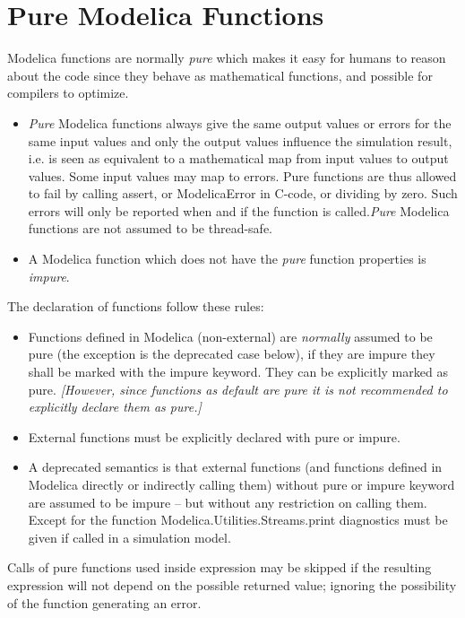 \section{Pure Modelica Functions}

Modelica functions are normally \emph{pure} which makes it easy for
humans to reason about the code since they behave as mathematical
functions, and possible for compilers to optimize.

\begin{itemize}
\item
  \emph{Pure} Modelica functions always give the same output values or
  errors for the same input values and only the output values influence
  the simulation result, i.e. is seen as equivalent to a mathematical
  map from input values to output values. Some input values may map to
  errors. Pure functions are thus allowed to fail by calling assert, or
  ModelicaError in C-code, or dividing by zero. Such errors will only be
  reported when and if the function is called.\emph{Pure} Modelica
  functions are not assumed to be thread-safe.
\item
  A Modelica function which does not have the \emph{pure} function
  properties is \emph{impure}.
\end{itemize}

The declaration of functions follow these rules:

\begin{itemize}
\item
  Functions defined in Modelica (non-external) are \emph{normally}
  assumed to be pure (the exception is the deprecated case below), if
  they are impure they shall be marked with the impure keyword. They can
  be explicitly marked as pure. \emph{{[}However, since functions as
  default are pure it is not recommended to explicitly declare them as
  pure.{]}}
\item
  External functions must be explicitly declared with pure or impure.
\item
  A deprecated semantics is that external functions (and functions
  defined in Modelica directly or indirectly calling them) without pure
  or impure keyword are assumed to be impure -- but without any
  restriction on calling them. Except for the function
  Modelica.Utilities.Streams.print diagnostics must be given if called
  in a simulation model.
\end{itemize}

Calls of pure functions used inside expression may be skipped if the
resulting expression will not depend on the possible returned value;
ignoring the possibility of the function generating an error.

